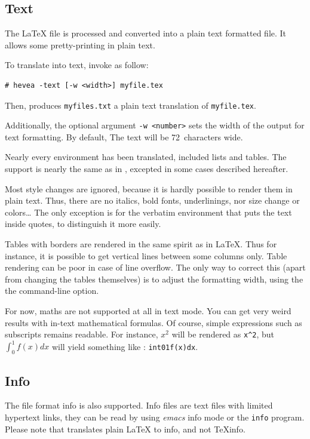 \subsection{Text}
The \LaTeX{} file is processed and converted into a plain text
formatted file. It allows some pretty-printing in plain text.

To translate into text, invoke \hevea{} as follow:
\begin{verbatim}
# hevea -text [-w <width>] myfile.tex
\end{verbatim}
Then, \hevea{} produces \texttt{myfiles.txt} a plain text translation
of \texttt{myfile.tex}.

Additionally, the optional argument \texttt{-w <number>} sets the
width of the output for text formatting. By default, The text will be
72~characters wide.

Nearly every environment has been translated, included lists and tables.
The support is nearly the same as in \html, excepted in some cases
described hereafter.

Most style changes are ignored, because it is hardly
possible to render them in plain text. Thus, there are no italics,
bold fonts, underlinings, nor size change or colors\ldots{}
The only exception is for the verbatim environment
that puts the text inside quotes, to distinguish it more easily.

Tables with borders are rendered in the same spirit as in \LaTeX{}.
Thus for instance, it is possible to get vertical lines between some
columns only.
Table rendering can be poor in case of line overflow.
The only way to correct this (apart from changing the tables
themselves) is to adjust the formatting width, using the
the  command-line option.

For now, maths are not supported at all in text mode. You can get very weird
results with in-text mathematical formulas.
Of course, simple expressions such as subscripts remains readable.
For instance, $x^2$ will be rendered as \verb+x^2+, but $\int_0^1f(x)dx$ will
yield something like : \verb+int01f(x)dx+.


\subsection{Info}
The file format info is also supported.
Info files are text files with limited hypertext links, they
can be read by using \emph{emacs} info mode or the
\texttt{info} program.
Please note that \hevea{} translates plain \LaTeX{} to info, and not
TeXinfo.

